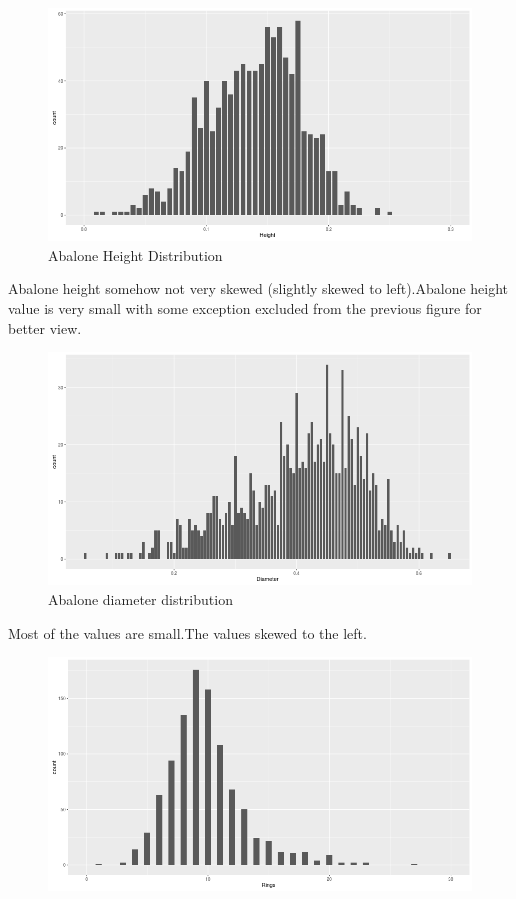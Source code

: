 \documentclass{article}
\begin{document}
\begin{multicols*}{2}
\begin{figure}[H]
\begin{center}
	\includegraphics[scale=0.3]{ggplotHeight.png}
\end{center}
\caption{Abalone Height Distribution}
\end{figure}
Abalone height somehow not very skewed (slightly skewed to left).Abalone height value is very small with some exception excluded from the previous figure for better view.
\begin{figure}[H]
	\begin{center}
		\includegraphics[scale=0.3]{ggplotdiameter.png}
	\end{center}
	\caption{Abalone diameter distribution}
\end{figure}
Most of the values are small.The values skewed to the left.
\begin{figure}[H]
	\begin{center}
		\includegraphics[scale=0.3]{ggplotRings.png}

\end{center}
\end{figure}
\end{multicols*}
\end{document}
